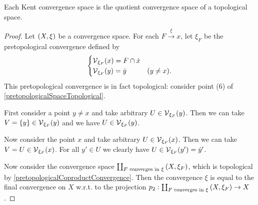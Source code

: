 \begin{proposition} \label{convergenceSpaceQuotientOfTopologicalSpace}
Each Kent convergence space is the quotient convergence space of a topological space.
\end{proposition}
\begin{proof}
Let $\left( X,\xi \right)$ be a convergence space. For each $F\overset{\xi}{\longrightarrow} x$, let $\xi_F$ be the pretopological convergence defined by
\[ \begin{cases}
\operatorname{\mathcal{V}}_{\xi_F}(x) = F \cap \dot{x}  \\
\operatorname{\mathcal{V}}_{\xi_F}(y) = \dot{y} & (y \neq x).
\end{cases} \]
This pretopological convergence is in fact topological: consider point (6) of \ref{pretopologicalSpaceTopological}.

First consider a point $y\neq x$ and take arbitrary $U\in \operatorname{\mathcal{V}}_{\xi_F}(y)$. Then we can take $V = \{y\} \in \operatorname{\mathcal{V}}_{\xi_F}(y)$ and we have $U\in \operatorname{\mathcal{V}}_{\xi_F}(y)$.

Now consider the point $x$ and take arbitrary $U\in \operatorname{\mathcal{V}}_{\xi_F}(x)$. Then we can take $V = U \in \operatorname{\mathcal{V}}_{\xi_F}(x)$. For all $y'\in U$ we clearly have $U\in \operatorname{\mathcal{V}}_{\xi_F}(y') = \dot{y}'$.

Now consider the convergence space $\coprod_{\text{$F$ converges in $\xi$}}\left( X, \xi_F \right)$, which is topological by \ref{pretopologicalCoproductConvergence}. Then the convergence $\xi$ is equal to the final convergence on $X$ w.r.t. to the projection $p_2: \coprod_{\text{$F$ converges in $\xi$}}\left( X, \xi_F \right) \to X$.
\end{proof}


